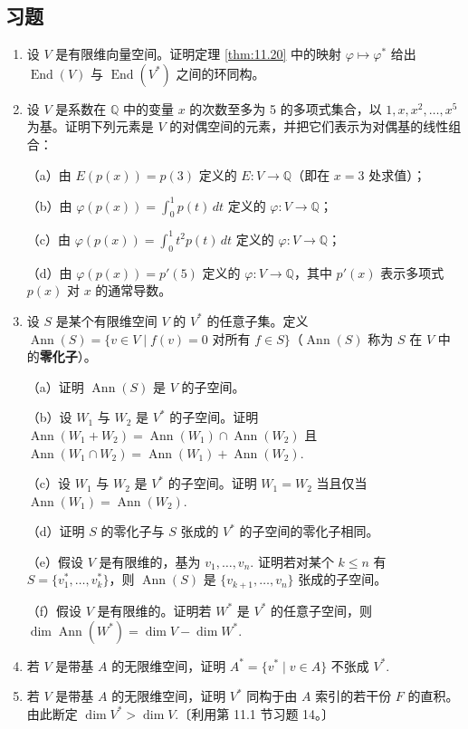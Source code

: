 \subsection*{习题}

\begin{enumerate}
\item 设 \(V\) 是有限维向量空间。证明定理 \ref{thm:11.20} 中的映射 \(\varphi \mapsto \varphi^*\) 给出 \(\operatorname{End}(V)\) 与 \(\operatorname{End}(V^*)\) 之间的环同构。

\item 设 \(V\) 是系数在 \(\mathbb{Q}\) 中的变量 \(x\) 的次数至多为 5 的多项式集合，以 \(1, x, x^2, \ldots, x^5\) 为基。证明下列元素是 \(V\) 的对偶空间的元素，并把它们表示为对偶基的线性组合：

（a）由 \(E(p(x)) = p(3)\) 定义的 \(E : V \to \mathbb{Q}\)（即在 \(x = 3\) 处求值）；

（b）由 \(\varphi(p(x)) = \int_0^1 p(t)\,dt\) 定义的 \(\varphi : V \to \mathbb{Q}\)；

（c）由 \(\varphi(p(x)) = \int_0^1 t^2p(t)\,dt\) 定义的 \(\varphi : V \to \mathbb{Q}\)；

（d）由 \(\varphi(p(x)) = p'(5)\) 定义的 \(\varphi : V \to \mathbb{Q}\)，其中 \(p'(x)\) 表示多项式 \(p(x)\) 对 \(x\) 的通常导数。

\item 设 \(S\) 是某个有限维空间 \(V\) 的 \(V^*\) 的任意子集。定义 \(\operatorname{Ann}(S) = \{v \in V \mid f(v) = 0 \text{ 对所有 } f \in S\}\)（\(\operatorname{Ann}(S)\) 称为 \(S\) 在 \(V\) 中的\textbf{零化子}）。

（a）证明 \(\operatorname{Ann}(S)\) 是 \(V\) 的子空间。

（b）设 \(W_1\) 与 \(W_2\) 是 \(V^*\) 的子空间。证明 \(\operatorname{Ann}(W_1+W_2) = \operatorname{Ann}(W_1) \cap \operatorname{Ann}(W_2)\) 且 \(\operatorname{Ann}(W_1 \cap W_2) = \operatorname{Ann}(W_1)+\operatorname{Ann}(W_2)\).

（c）设 \(W_1\) 与 \(W_2\) 是 \(V^*\) 的子空间。证明 \(W_1 = W_2\) 当且仅当 \(\operatorname{Ann}(W_1) = \operatorname{Ann}(W_2)\).

（d）证明 \(S\) 的零化子与 \(S\) 张成的 \(V^*\) 的子空间的零化子相同。

（e）假设 \(V\) 是有限维的，基为 \(v_1, \ldots, v_n\). 证明若对某个 \(k \leq n\) 有 \(S = \{v_1^*, \ldots, v_k^*\}\)，则 \(\operatorname{Ann}(S)\) 是 \(\{v_{k+1}, \ldots, v_n\}\) 张成的子空间。

（f）假设 \(V\) 是有限维的。证明若 \(W^*\) 是 \(V^*\) 的任意子空间，则 \(\dim\operatorname{Ann}(W^*) = \dim V-\dim W^*\).

\item 若 \(V\) 是带基 \(A\) 的无限维空间，证明 \(A^* = \{v^* \mid v \in A\}\) 不张成 \(V^*\).

\item 若 \(V\) 是带基 \(A\) 的无限维空间，证明 \(V^*\) 同构于由 \(A\) 索引的若干份 \(F\) 的直积。由此断定 \(\dim V^* > \dim V\).〔利用第 11.1 节习题 14。〕
\end{enumerate}

